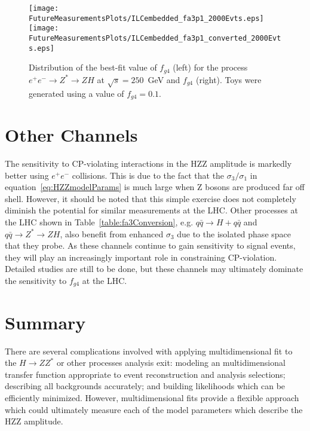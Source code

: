 
\begin{figure}
\begin{center}
\texttt{[image: FutureMeasurementsPlots/ILCembedded\_fa3p1\_2000Evts.eps]}
\texttt{[image: FutureMeasurementsPlots/ILCembedded\_fa3p1\_converted\_2000Evts.eps]}
\caption{Distribution of the best-fit value of $f_{g4}$ (left) for
the process $e^+e^-\to Z^*\to ZH$ at $\sqrt{s}=250$~GeV and $f_{g4}$
(right).  Toys were generated using a value of $f_{g4}=0.1$.}
\label{fig:ILCsensitivity}
\end{center}
\end{figure}

\section{Other Channels}

The sensitivity to CP-violating interactions in the 
HZZ amplitude is markedly better using $e^+e^-$ collisions. 
This is due to the fact that the $\sigma_3/\sigma_1$ in 
equation~\ref{eq:HZZmodelParams} is much large when Z bosons
are produced far off shell.
However, it should be noted that this simple exercise does not
completely diminish the potential for similar measurements at 
the LHC.  Other processes at the LHC shown in
Table~\ref{table:fa3Conversion},
e.g. $q\bar{q}\to H + q\bar{q}$ and $q\bar{q}\to Z^* \to ZH$,
also benefit from enhanced $\sigma_3$
due to the isolated phase space that they probe.  As these channels 
continue to gain sensitivity to signal events, they will play an
increasingly important role in constraining CP-violation.
Detailed studies are still to be done, but these channels may
ultimately dominate the sensitivity to $f_{g4}$ at the LHC.  

\section{Summary}

There are several complications involved with applying
multidimensional fit to the $H\to ZZ^*$ or other processes
analysis exit:
modeling an multidimensional transfer function appropriate
to event reconstruction and analysis selections; describing all 
backgrounds accurately; and building likelihoods which can be
efficiently minimized. However, multidimensional fits provide
a flexible approach which
could ultimately measure each of the model parameters which 
describe the HZZ amplitude.  

